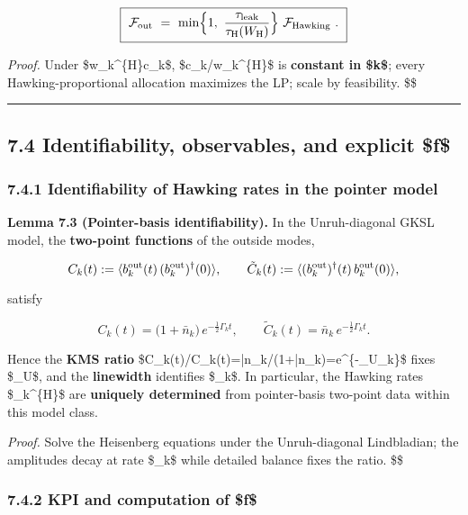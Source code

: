 \documentclass[
]{article}
\numberwithin{equation}{section}
\begin{document}
\[
\boxed{\
\mathcal F_{\rm out}\ =\ \min\!\Big\{1,\ \frac{\tau_{\rm leak}}{\tau_{\rm H}(W_{\rm H})}\Big\}\ \mathcal F_{\rm Hawking}\ .
\ }
\]

\emph{Proof.} Under \$w\_k\^{}\{\rm H\}\propto c\_k\$,
\$c\_k/w\_k\^{}\{\rm H\}\$ is \textbf{constant in \$k\$}; every
Hawking-proportional allocation maximizes the LP; scale by feasibility.
\$\square\$

\begin{center}\rule{0.5\linewidth}{0.5pt}\end{center}

\hypertarget{identifiability-observables-and-explicit-f}{%
\subsection{7.4 Identifiability, observables, and explicit
\$f\$}\label{identifiability-observables-and-explicit-f}}

\hypertarget{identifiability-of-hawking-rates-in-the-pointer-model}{%
\subsubsection{7.4.1 Identifiability of Hawking rates in the pointer
model}\label{identifiability-of-hawking-rates-in-the-pointer-model}}

\textbf{Lemma 7.3 (Pointer-basis identifiability).} In the
Unruh-diagonal GKSL model, the \textbf{two-point functions} of the
outside modes,

\[
C_k(t):=\langle b_k^{\rm out}(t)\,(b_k^{\rm out})^\dagger(0)\rangle,\qquad 
\tilde C_k(t):=\langle (b_k^{\rm out})^\dagger(t)\,b_k^{\rm out}(0)\rangle,
\]

satisfy

\[
C_k(t)=\big(1+\bar n_k\big)\,e^{-\tfrac12\Gamma_k t},\qquad 
\tilde C_k(t)=\bar n_k\,e^{-\tfrac12\Gamma_k t}.
\]

Hence the \textbf{KMS ratio}
\$\tilde C\_k(t)/C\_k(t)=\bar n\_k/(1+\bar n\_k)=e\^{}\{-\beta\_U\omega\_k\}\$
fixes \$\beta\_U\$, and the \textbf{linewidth} identifies \$\Gamma\_k\$.
In particular, the Hawking rates \$\Gamma\_k\^{}\{\rm H\}\$ are
\textbf{uniquely determined} from pointer-basis two-point data within
this model class.

\emph{Proof.} Solve the Heisenberg equations under the Unruh-diagonal
Lindbladian; the amplitudes decay at rate \$\tfrac12\Gamma\_k\$ while
detailed balance fixes the ratio. \$\square\$

\hypertarget{kpi-and-computation-of-f}{%
\subsubsection{7.4.2 KPI and computation of
\$f\$}\label{kpi-and-computation-of-f}}
\end{document}
